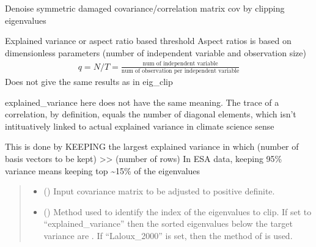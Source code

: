 \documentclass[letterpaper,10pt,english]{sphinxmanual}
\begin{document}
\begin{fulllineitems}
\label{\detokenize{misc:glomar_gridding.covariance_tools.eigenvalue_clip}}
\pysigstartsignatures
\pysiglinewithargsret
{}
{\sphinxparamcomma {}\sphinxparamcomma {}}
{}
\pysigstopsignatures
\sphinxAtStartPar
Denoise symmetric damaged covariance/correlation matrix cov by clipping
eigenvalues

\sphinxAtStartPar
Explained variance or aspect ratio based threshold
Aspect ratios is based on dimensionless parameters
(number of independent variable and observation size)
\begin{equation*}
\begin{split}q = N/T = \frac{\text{num of independent variable}}{\text{num of
                                  observation per independent variable}}\end{split}
\end{equation*}
\sphinxAtStartPar
Does not give the same results as in eig\_clip

\sphinxAtStartPar
explained\_variance here does not have the same meaning.
The trace of a correlation, by definition, equals the number of diagonal
elements, which isn’t intituatively linked to actual explained variance
in climate science sense

\sphinxAtStartPar
This is done by KEEPING the largest explained variance
in which (number of basis vectors to be kept) \textgreater{}\textgreater{} (number of rows)
In ESA data, keeping 95\% variance means keeping top \textasciitilde{}15\% of the
eigenvalues
\begin{quote}\begin{description}
\begin{itemize}
\item {}
\sphinxAtStartPar
{} () \textendash{} Input covariance matrix to be adjusted to positive definite.

\item {}
\sphinxAtStartPar
{} (\sphinxstyleliteralemphasis{\sphinxupquote{ | }}) \textendash{} Method used to identify the index of the eigenvalues to clip. If set to
“explained\_variance” then the sorted eigenvalues below the target
variance are . If “Laloux\_2000” is set, then the method of
 is used.


\end{itemize}
\end{description}
\end{quote}
\end{fulllineitems}
\end{document}
